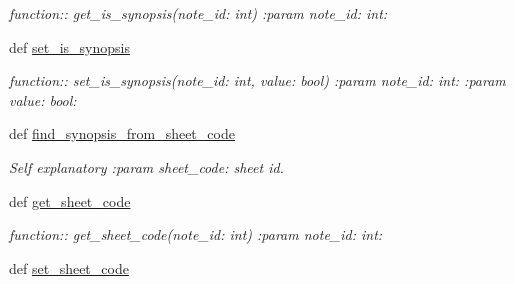 \begin{DoxyCompactItemize}
\begin{DoxyCompactList}\small\item\em function\+:\+: get\+\_\+is\+\_\+synopsis(note\+\_\+id\+: int) \+:param note\+\_\+id\+: int\+: \end{DoxyCompactList}\item 
def \hyperlink{classplume-creator_1_1src_1_1plume_1_1data_1_1tree_1_1note__tree_1_1_note_tree_a6078e18ea274f95e82cdf243ccdd7e8a}{set\+\_\+is\+\_\+synopsis}\hypertarget{classplume-creator_1_1src_1_1plume_1_1data_1_1tree_1_1note__tree_1_1_note_tree_a6078e18ea274f95e82cdf243ccdd7e8a}{}\label{classplume-creator_1_1src_1_1plume_1_1data_1_1tree_1_1note__tree_1_1_note_tree_a6078e18ea274f95e82cdf243ccdd7e8a}

\begin{DoxyCompactList}\small\item\em function\+:\+: set\+\_\+is\+\_\+synopsis(note\+\_\+id\+: int, value\+: bool) \+:param note\+\_\+id\+: int\+: \+:param value\+: bool\+: \end{DoxyCompactList}\item 
def \hyperlink{classplume-creator_1_1src_1_1plume_1_1data_1_1tree_1_1note__tree_1_1_note_tree_a61157d3907e9dc2fa4c20ef626ac0cdc}{find\+\_\+synopsis\+\_\+from\+\_\+sheet\+\_\+code}\hypertarget{classplume-creator_1_1src_1_1plume_1_1data_1_1tree_1_1note__tree_1_1_note_tree_a61157d3907e9dc2fa4c20ef626ac0cdc}{}\label{classplume-creator_1_1src_1_1plume_1_1data_1_1tree_1_1note__tree_1_1_note_tree_a61157d3907e9dc2fa4c20ef626ac0cdc}

\begin{DoxyCompactList}\small\item\em Self explanatory \+:param sheet\+\_\+code\+: sheet id. \end{DoxyCompactList}\item 
def \hyperlink{classplume-creator_1_1src_1_1plume_1_1data_1_1tree_1_1note__tree_1_1_note_tree_a912eae0c2b11810879856a17c6828e7f}{get\+\_\+sheet\+\_\+code}\hypertarget{classplume-creator_1_1src_1_1plume_1_1data_1_1tree_1_1note__tree_1_1_note_tree_a912eae0c2b11810879856a17c6828e7f}{}\label{classplume-creator_1_1src_1_1plume_1_1data_1_1tree_1_1note__tree_1_1_note_tree_a912eae0c2b11810879856a17c6828e7f}

\begin{DoxyCompactList}\small\item\em function\+:\+: get\+\_\+sheet\+\_\+code(note\+\_\+id\+: int) \+:param note\+\_\+id\+: int\+: \end{DoxyCompactList}\item 
def \hyperlink{classplume-creator_1_1src_1_1plume_1_1data_1_1tree_1_1note__tree_1_1_note_tree_abc529f49415d619dbd32b7cee23e42c0}{set\+\_\+sheet\+\_\+code}\hypertarget{classplume-creator_1_1src_1_1plume_1_1data_1_1tree_1_1note__tree_1_1_note_tree_abc529f49415d619dbd32b7cee23e42c0}{}\label{classplume-creator_1_1src_1_1plume_1_1data_1_1tree_1_1note__tree_1_1_note_tree_abc529f49415d619dbd32b7cee23e42c0}


\end{DoxyCompactItemize}
